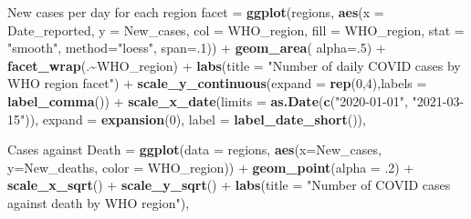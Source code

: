 \documentclass[
]{article}
\newenvironment{Shaded}{\begin{snugshade}}{\end{snugshade}}
\newcommand{\DataTypeTok}[1]{\textcolor[rgb]{0.00,0.34,0.68}{#1}}
\newcommand{\DecValTok}[1]{\textcolor[rgb]{0.69,0.50,0.00}{#1}}
\newcommand{\FloatTok}[1]{\textcolor[rgb]{0.69,0.50,0.00}{#1}}
\newcommand{\KeywordTok}[1]{\textcolor[rgb]{0.12,0.11,0.11}{\textbf{#1}}}
\newcommand{\NormalTok}[1]{\textcolor[rgb]{0.12,0.11,0.11}{#1}}
\newcommand{\OperatorTok}[1]{\textcolor[rgb]{0.12,0.11,0.11}{#1}}
\newcommand{\StringTok}[1]{\textcolor[rgb]{0.75,0.01,0.01}{#1}}
\begin{document}
\begin{Shaded}
\begin{Highlighting}[]
\StringTok{\textasciigrave{}}\DataTypeTok{New cases per day for each region facet}\StringTok{\textasciigrave{}}\NormalTok{ =}
\StringTok{   }\KeywordTok{ggplot}\NormalTok{(regions, }\KeywordTok{aes}\NormalTok{(}\DataTypeTok{x =}\NormalTok{ Date\_reported, }\DataTypeTok{y =}\NormalTok{ New\_cases,}
                       \DataTypeTok{col =}\NormalTok{ WHO\_region, }\DataTypeTok{fill =}\NormalTok{ WHO\_region,}
                       \DataTypeTok{stat =} \StringTok{"smooth"}\NormalTok{,  }\DataTypeTok{method=}\StringTok{"loess"}\NormalTok{, }\DataTypeTok{span=}\NormalTok{.}\DecValTok{1}\NormalTok{)) }\OperatorTok{+}
\StringTok{   }\KeywordTok{geom\_area}\NormalTok{( }\DataTypeTok{alpha=}\NormalTok{.}\DecValTok{5}\NormalTok{) }\OperatorTok{+}\StringTok{ }
\StringTok{  }\KeywordTok{facet\_wrap}\NormalTok{(.}\OperatorTok{\textasciitilde{}}\NormalTok{WHO\_region) }\OperatorTok{+}
\StringTok{  }\KeywordTok{labs}\NormalTok{(}\DataTypeTok{title =} \StringTok{"Number of daily COVID cases by WHO region facet"}\NormalTok{) }\OperatorTok{+}
\StringTok{  }\KeywordTok{scale\_y\_continuous}\NormalTok{(}\DataTypeTok{expand =} \KeywordTok{rep}\NormalTok{(}\DecValTok{0}\NormalTok{,}\DecValTok{4}\NormalTok{),}\DataTypeTok{labels =} \KeywordTok{label\_comma}\NormalTok{()) }\OperatorTok{+}
\StringTok{  }\KeywordTok{scale\_x\_date}\NormalTok{(}\DataTypeTok{limits =} \KeywordTok{as.Date}\NormalTok{(}\KeywordTok{c}\NormalTok{(}\StringTok{"2020{-}01{-}01"}\NormalTok{, }\StringTok{"2021{-}03{-}15"}\NormalTok{)),}
               \DataTypeTok{expand =} \KeywordTok{expansion}\NormalTok{(}\DecValTok{0}\NormalTok{),}
               \DataTypeTok{label =} \KeywordTok{label\_date\_short}\NormalTok{()),}

\StringTok{\textasciigrave{}}\DataTypeTok{Cases against Death}\StringTok{\textasciigrave{}}\NormalTok{ =}\StringTok{ }\KeywordTok{ggplot}\NormalTok{(}\DataTypeTok{data =}\NormalTok{ regions,}
    \KeywordTok{aes}\NormalTok{(}\DataTypeTok{x=}\NormalTok{New\_cases, }\DataTypeTok{y=}\NormalTok{New\_deaths, }\DataTypeTok{color =}\NormalTok{ WHO\_region)) }\OperatorTok{+}
\StringTok{    }\KeywordTok{geom\_point}\NormalTok{(}\DataTypeTok{alpha =} \FloatTok{.2}\NormalTok{) }\OperatorTok{+}\StringTok{ }
\StringTok{    }\KeywordTok{scale\_x\_sqrt}\NormalTok{() }\OperatorTok{+}\StringTok{ }\KeywordTok{scale\_y\_sqrt}\NormalTok{() }\OperatorTok{+}
\StringTok{    }\KeywordTok{labs}\NormalTok{(}\DataTypeTok{title =} \StringTok{"Number of COVID cases against death by WHO region"}\NormalTok{),}
     


\end{Highlighting}
\end{Shaded}
\end{document}
